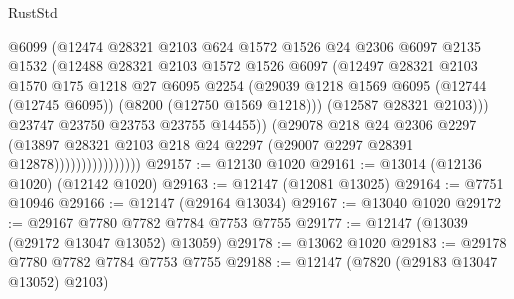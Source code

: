 \begin{lexlean}{RustStd}
\begin{coremodule}
                                @6099
                                (@12474
                                  @28321
                                  @2103
                                  @624
                                  @1572
                                  @1526
                                  @24
                                  @2306
                                  @6097
                                  @2135
                                  @1532
                                  (@12488
                                    @28321
                                    @2103
                                    @1572
                                    @1526
                                    @6097
                                    (@12497
                                      @28321
                                      @2103
                                      @1570
                                      @175
                                      @1218
                                      @27
                                      @6095
                                      @2254
                                      (@29039
                                        @1218
                                        @1569
                                        @6095
                                        (@12744 (@12745 @6095))
                                        (@8200 (@12750 @1569 @1218)))
                                      (@12587 @28321 @2103)))
                                  @23747
                                  @23750
                                  @23753
                                  @23755
                                  @14455))
                              (@29078
                                @218
                                @24
                                @2306
                                @2297
                                (@13897
                                  @28321
                                  @2103
                                  @218
                                  @24
                                  @2297
                                  (@29007 @2297 @28391 @12878))))))))))))))))
@29157 := @12130 @1020
@29161 := @13014 (@12136 @1020) (@12142 @1020)
@29163 := @12147 (@12081 @13025)
@29164 := @7751 @10946
@29166 := @12147 (@29164 @13034)
@29167 := @13040 @1020
@29172 := @29167 @7780 @7782 @7784 @7753 @7755
@29177 := @12147 (@13039 (@29172 @13047 @13052) @13059)
@29178 := @13062 @1020
@29183 := @29178 @7780 @7782 @7784 @7753 @7755
@29188 := @12147 (@7820 (@29183 @13047 @13052) @2103)

\end{coremodule}
\end{lexlean}
